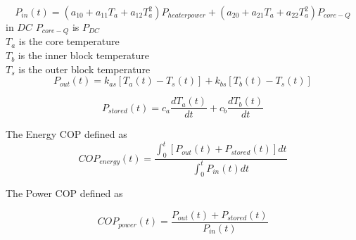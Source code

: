 \documentclass{article}
\begin{document}
\begin{equation}
P_{in}(t)=(a_{10}+a_{11}T_{a}+a_{12}T_{a}^{2})P_{heaterpower} + (a_{20}+a_{21}T_{a}+a_{22}T_{a}^{2})P_{core-Q}\label{1}%
\end{equation}
in $DC$ $P_{core-Q}$ is $P_{DC}$\\

$T_{a}$ is the core temperature\\
$T_{b}$ is the inner block temperature\\
$T_{s}$ is the outer block temperature\\

\begin{equation}
P_{out}(t)=k_{as}[T_{a}(t)-T_{s}(t)]+k_{bs}[T_{b}(t)-T_{s}(t)]\label{1}%
\end{equation}  

\begin{equation}
P_{stored}(t)=c_{a}\frac{dT_{a}(t)}{dt}+c_{b}\frac{dT_{b}(t)}{dt}\label{1}%
\end{equation}  

The Energy COP defined as
\begin{equation}
COP_{energy}(t)=\frac{\int_{0}^{t}{[P_{out}(t)+P_{stored}(t)]dt}}{\int_{0}^{t}P_{in}(t)dt}\label{1}%
\end{equation}

The Power COP defined as

\begin{equation}
COP_{power}(t)=\frac{{P_{out}(t)+P_{stored}(t)}}{P_{in}(t)}\label{1}%
\end{equation}
\end{document}
